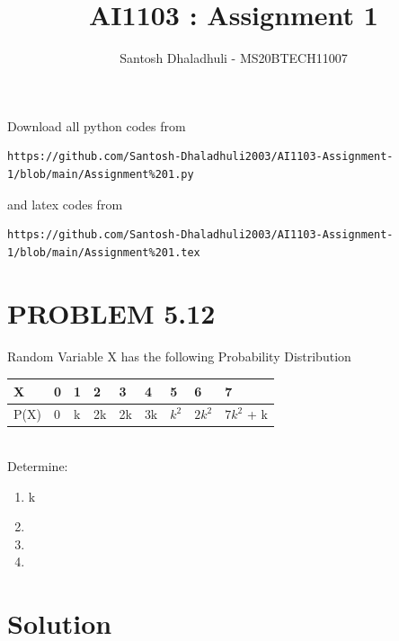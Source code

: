 \documentclass[journal,12pt,twocolumn]{IEEEtran}
\begin{document}
     \def\rightbox#1{\makebox[0in][r]{#1}}
     \def\centbox#1{\makebox[0in]{#1}}
     \def\topbox#1{\raisebox{-\baselineskip}[0in][0in]{#1}}
     \def\midbox#1{\raisebox{-0.5\baselineskip}[0in][0in]{#1}}
\vspace{3cm}
\title{AI1103 : Assignment 1}
\author{Santosh Dhaladhuli - MS20BTECH11007}
\maketitle
\newpage
\bigskip
\renewcommand{\thefigure}{\theenumi}
\renewcommand{\thetable}{\theenumi}
Download all python codes from 
\begin{lstlisting}
https://github.com/Santosh-Dhaladhuli2003/AI1103-Assignment-1/blob/main/Assignment%201.py
\end{lstlisting}
%
and latex codes from 
%
\begin{lstlisting}
https://github.com/Santosh-Dhaladhuli2003/AI1103-Assignment-1/blob/main/Assignment%201.tex
\end{lstlisting}
\section*{PROBLEM 5.12}
Random Variable X has the following Probability Distribution \\
\begin{table}[h]
\begin{tabular}{|l|l|l|l|l|l|l|l|l|}
\hline
X    & 0 & 1 & 2  & 3  & 4  & 5   & 6  & 7                     \\ \hline    
P(X) & 0 & k & 2k & 2k & 3k & $k^2$ & $2k^2$ & $7k^2$ + k \\ 
\hline
\end{tabular}
\end{table} 
\\
Determine:
\begin{enumerate}
\item k 
\item {} 
\item {}  
\item {}
\end{enumerate}
\section*{Solution}
\end{document}
